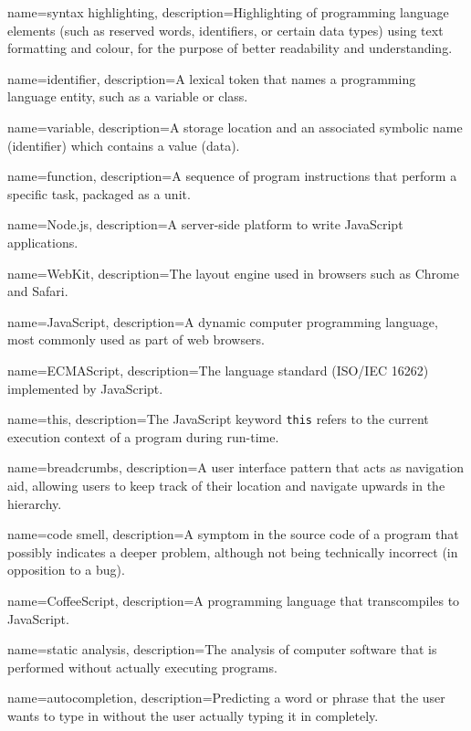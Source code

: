 
{
	name=syntax highlighting,
	description={Highlighting of programming language elements (such as reserved words, identifiers, or certain data types) using text formatting and colour, for the purpose of better readability and understanding.}
}

{
	name=identifier,
	description={A lexical token that names a programming language entity, such as a variable or class.}
}

{
	name=variable,
	description={A storage location and an associated symbolic name (identifier) which contains a value (data).}
}

{
	name=function,
	description={A sequence of program instructions that perform a specific task, packaged as a unit.}
}

{
	name=Node.js,
	description={A server-side platform to write JavaScript applications.}
}

{
	name=WebKit,
	description={The layout engine used in browsers such as Chrome and Safari.}
}

{
	name=JavaScript,
	description={A dynamic computer programming language, most commonly used as part of web browsers.}
}

{
	name=ECMAScript,
	description={The language standard (ISO/IEC 16262) implemented by JavaScript.}
}

{
	name=this,
	description={The JavaScript keyword \texttt{this} refers to the current execution context of a program during run-time.}
}

{
	name=breadcrumbs,
	description={A user interface pattern that acts as navigation aid, allowing users to keep track of their location and navigate upwards in the hierarchy.}
}

{
	name=code smell,
	description={A symptom in the source code of a program that possibly indicates a deeper problem, although not being technically incorrect (in opposition to a bug).}
}

{
	name=CoffeeScript,
	description={A programming language that transcompiles to JavaScript.}
}

{
	name=static analysis,
	description={The analysis of computer software that is performed without actually executing programs.}
}

{
	name=autocompletion,
	description={Predicting a word or phrase that the user wants to type in without the user actually typing it in completely.}
}


